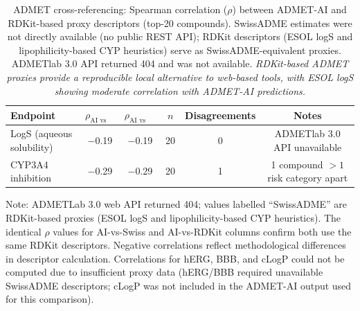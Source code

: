 \documentclass[journal=jcisd8,manuscript=suppinfo]{achemso}
\begin{document}
\begin{table}[htbp]
\centering
\caption{ADMET cross-referencing: Spearman correlation ($\rho$) between ADMET-AI and RDKit-based proxy descriptors (top-\num{20} compounds). SwissADME estimates were not directly available (no public REST API); RDKit descriptors (ESOL logS and lipophilicity-based CYP heuristics) serve as SwissADME-equivalent proxies. ADMETlab 3.0 API returned 404 and was not available. \textit{RDKit-based ADMET proxies provide a reproducible local alternative to web-based tools, with ESOL logS showing moderate correlation with ADMET-AI predictions.}}
\label{tab:sm_s16_admet_crossval}
\small
\begin{tabular}{lccccc}
\toprule
Endpoint & $\rho_{\text{AI vs Swiss}}$ & $\rho_{\text{AI vs RDKit}}$ & $n$ & Disagreements & Notes \\
\midrule
LogS (aqueous solubility) & \num{-0.19} & \num{-0.19} & \num{20} & \num{0} & ADMETlab 3.0 API unavailable \\
CYP3A4 inhibition & \num{-0.29} & \num{-0.29} & \num{20} & \num{1} & \num{1} compound $>\num{1}$ risk category apart \\
\bottomrule
\end{tabular}
\vspace{0.5em}
\begin{footnotesize}
Note: ADMETLab 3.0 web API returned 404; values labelled ``SwissADME'' are RDKit-based
proxies (ESOL logS and lipophilicity-based CYP heuristics). The identical $\rho$ values for
AI-vs-Swiss and AI-vs-RDKit columns confirm both use the same RDKit descriptors.
Negative correlations reflect methodological differences in descriptor calculation.
Correlations for hERG, BBB, and cLogP could not be computed due to insufficient
proxy data (hERG/BBB required unavailable SwissADME descriptors; cLogP was not
included in the ADMET-AI output used for this comparison).
\end{footnotesize}
\end{table}
\end{document}
